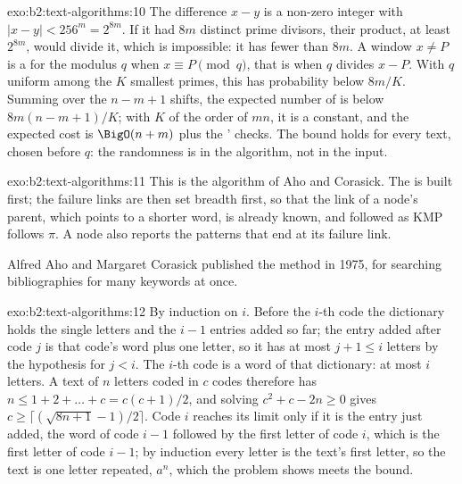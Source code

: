 \begin{solution}{exo:b2:text-algorithms:10}
The difference $x - y$ is a non-zero integer with $|x - y| < 256^m = 2^{8m}$. If it had $8m$ distinct prime divisors,
their product, at least $2^{8m}$, would divide it, which is impossible: it has fewer than $8m$. A window $x \neq P$ is a
 for the modulus $q$ when $x \equiv P \pmod q$, that is when $q$ divides $x - P$. With $q$ uniform among the
$K$ smallest primes, this has probability below $8m/K$. Summing over the $n - m + 1$ shifts, the expected number of
 is below $8m(n - m + 1)/K$; with $K$ of the order of $mn$, it is a constant, and the expected cost is
$\BigO(n + m)$ plus the ' checks. The bound holds for every text, chosen before $q$: the randomness is in
the algorithm, not in the input.
\end{solution}

\begin{solution}{exo:b2:text-algorithms:11}
This is the algorithm of Aho and Corasick. The  is built first; the failure links are then set breadth first, so that
the link of a node's parent, which points to a shorter word, is already known, and followed as KMP follows $\pi$. A node
also reports the patterns that end at its failure link.



Alfred Aho and Margaret Corasick published the method in 1975, for searching bibliographies for many keywords at once.
\end{solution}

\begin{solution}{exo:b2:text-algorithms:12}
By induction on $i$. Before the $i$-th code the dictionary holds the single letters and the $i - 1$ entries added so
far; the entry added after code $j$ is that code's word plus one letter, so it has at most $j + 1 \leq i$ letters by
the hypothesis for $j < i$. The $i$-th code is a word of that dictionary: at most $i$ letters. A text of $n$ letters
coded in $c$ codes therefore has $n \leq 1 + 2 + \dots + c = c(c+1)/2$, and solving $c^2 + c - 2n \geq 0$ gives $c \geq
\lceil (\sqrt{8n+1}-1)/2 \rceil$. Code $i$ reaches its limit only if it is the entry just added, the word of code $i - 1$ followed
by the first letter of code $i$, which is the first letter of code $i - 1$; by induction every letter is the text's
first letter, so the text is one letter repeated, $a^n$, which the problem shows meets the bound.

\end{solution}

